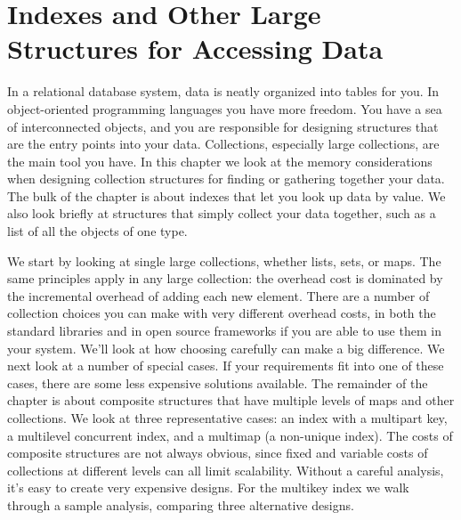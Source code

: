 \chapter{Indexes and Other Large Structures for Accessing Data}
\label{chapter:tables-indexes}

In a relational database system, data is neatly organized into tables for you. 
In object-oriented programming languages you have more freedom. You have a sea
of interconnected objects, and you are
responsible for designing structures that are the entry points into your
data.  Collections, especially large collections, are the
main tool you have. In this chapter we look at the memory considerations when
designing collection structures for finding or gathering together your
data. The bulk of the chapter is about indexes that let you look up data by
value. We also look briefly at structures that simply collect your data together, such as
a list of all the objects of one type. 

We start by looking at single large
collections, whether lists, sets, or maps.  The same principles apply in any
large collection: the overhead cost is dominated by the
incremental overhead of adding each new element.  There are a number of
collection choices you can make with very different overhead costs, in both the
standard libraries and in open source frameworks if you are able to use them in your system. We'll look
at how choosing carefully can make a big difference.  We
next look at a number of special cases. If your requirements fit into one of
these cases, there are some less expensive solutions
available. The remainder of the chapter is about composite structures that have
multiple levels of maps and other collections. We look at three representative cases: 
an index with a multipart key, a multilevel concurrent index, and a multimap (a non-unique index). 
The costs of composite structures are not always obvious, since fixed and variable costs of collections
at different levels can all limit scalability. Without a careful analysis, it's easy to create very expensive designs.
For the multikey index we walk through a sample analysis, comparing
three alternative designs.



